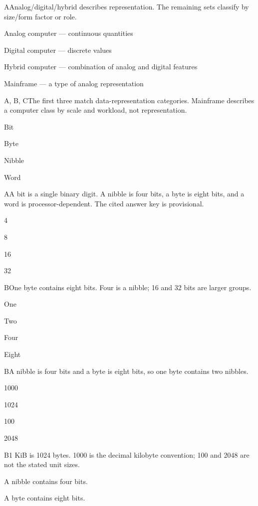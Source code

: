 \begin{enumerate}[label=\textbf{Q\arabic*.}, leftmargin=*]
  {A}{Analog/digital/hybrid describes representation. The remaining sets classify by size/form factor or role.}
  {\item Analog computer --- continuous quantities
   \item Digital computer --- discrete values
   \item Hybrid computer --- combination of analog and digital features
   \item Mainframe --- a type of analog representation}
  {A, B, C}{The first three match data-representation categories. Mainframe describes a computer class by scale and workload, not representation.}
\fi
\ifnum{}
  {\item Bit
   \item Byte
   \item Nibble
   \item Word}
  {A}{A bit is a single binary digit. A nibble is four bits, a byte is eight bits, and a word is processor-dependent. The cited answer key is provisional.}
  {\item 4
   \item 8
   \item 16
   \item 32}
  {B}{One byte contains eight bits. Four is a nibble; 16 and 32 bits are larger groups.}
  {\item One
   \item Two
   \item Four
   \item Eight}
  {B}{A nibble is four bits and a byte is eight bits, so one byte contains two nibbles.}
  {\item 1000
   \item 1024
   \item 100
   \item 2048}
  {B}{1 KiB is 1024 bytes. 1000 is the decimal kilobyte convention; 100 and 2048 are not the stated unit sizes.}
  {\item A nibble contains four bits.
   \item A byte contains eight bits.
}
\end{enumerate}
